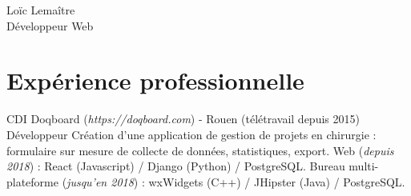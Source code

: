 \documentclass[10pt]{article} %
\begin{document}
\begin{paracol}{2} %


  \parbox[top][0.12\textheight][c]{\linewidth}{ %
    \vspace{-0.04\textheight} %
    \centering %
    {\sffamily\Huge Loïc Lemaître}\\\medskip %
    {\Huge\color{headings}\cvtextfont Développeur Web}
  }


  \section{Expérience professionnelle}





  {CDI} %
  {Doqboard {\small(\textit{https://doqboard.com})} {\small- Rouen (télétravail depuis 2015)}} %
  {Développeur} %
  { Création d'une application de gestion de projets en chirurgie : formulaire sur mesure de collecte de données, statistiques, export. Web {\small(\textit{depuis 2018})} : React (Javascript) / Django (Python) / PostgreSQL. Bureau multi-plateforme {\small(\textit{jusqu'en 2018})} : wxWidgets (C++) / JHipster (Java) / PostgreSQL.
  } %



\end{paracol}
\end{document}
